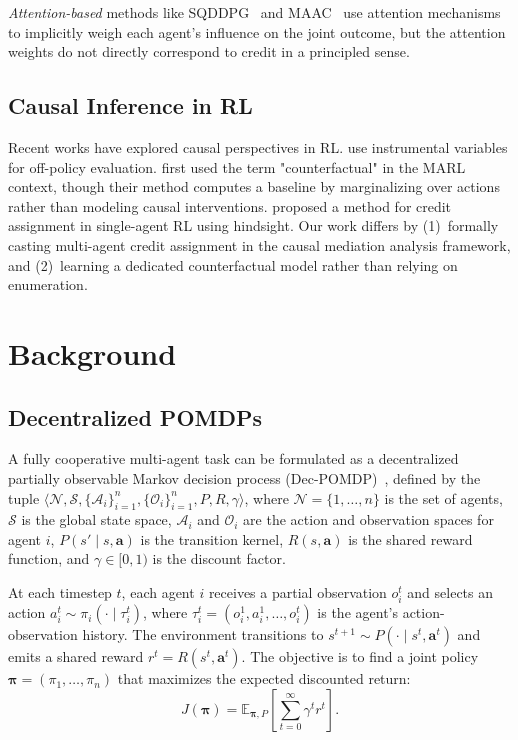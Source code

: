 \documentclass[journal]{IEEEtran}
\newcommand{\EE}{\mathbb{E}}
\begin{document}
\emph{Attention-based} methods like SQDDPG~\cite{wang2020sqddpg} and MAAC~\cite{iqbal2019actor} use attention mechanisms to implicitly weigh each agent's influence on the joint outcome, but the attention weights do not directly correspond to credit in a principled sense.

\subsection{Causal Inference in RL}

Recent works have explored causal perspectives in RL. \citet{lu2018nonparametric} use instrumental variables for off-policy evaluation. \citet{foerster2018counterfactual} first used the term "counterfactual" in the MARL context, though their method computes a baseline by marginalizing over actions rather than modeling causal interventions. \citet{mesnard2021counterfactual} proposed a method for credit assignment in single-agent RL using hindsight. Our work differs by (1)~formally casting multi-agent credit assignment in the causal mediation analysis framework, and (2)~learning a dedicated counterfactual model rather than relying on enumeration.

\section{Background}
\label{sec:background}

\subsection{Decentralized POMDPs}

A fully cooperative multi-agent task can be formulated as a decentralized partially observable Markov decision process (Dec-POMDP)~\cite{oliehoek2016concise}, defined by the tuple $\langle \mathcal{N}, \mathcal{S}, \{\mathcal{A}_i\}_{i=1}^n, \{\mathcal{O}_i\}_{i=1}^n, P, R, \gamma \rangle$, where $\mathcal{N} = \{1, \ldots, n\}$ is the set of agents, $\mathcal{S}$ is the global state space, $\mathcal{A}_i$ and $\mathcal{O}_i$ are the action and observation spaces for agent $i$, $P(s' \mid s, \mathbf{a})$ is the transition kernel, $R(s, \mathbf{a})$ is the shared reward function, and $\gamma \in [0, 1)$ is the discount factor.

At each timestep $t$, each agent $i$ receives a partial observation $o_i^t$ and selects an action $a_i^t \sim \pi_i(\cdot \mid \tau_i^t)$, where $\tau_i^t = (o_i^1, a_i^1, \ldots, o_i^t)$ is the agent's action-observation history. The environment transitions to $s^{t+1} \sim P(\cdot \mid s^t, \mathbf{a}^t)$ and emits a shared reward $r^t = R(s^t, \mathbf{a}^t)$. The objective is to find a joint policy $\bm{\pi} = (\pi_1, \ldots, \pi_n)$ that maximizes the expected discounted return:
\begin{equation}
    J(\bm{\pi}) = \EE_{\bm{\pi}, P}\left[\sum_{t=0}^{\infty} \gamma^t r^t\right].
\end{equation}
\end{document}
